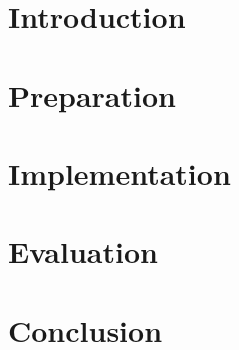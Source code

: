 \documentclass[12pt,twoside,notitlepage]{report}
\begin{document}
\tableofcontents

\newpage


\cleardoublepage        %

\setcounter{page}{1}
\pagestyle{headings}

\chapter{Introduction}


\chapter{Preparation}


\chapter{Implementation}


\chapter{Evaluation}


\chapter{Conclusion}




\cleardoublepage

\end{document}
